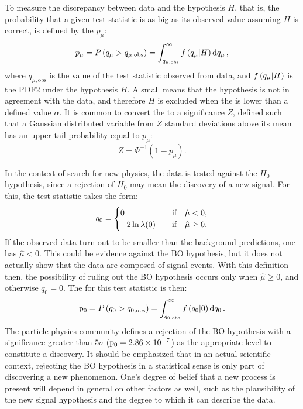 To measure the discrepancy between data and the hypothesis \(H\), that is, the probability that a given test statistic is as big as its observed value assuming \(H\) is correct, is defined by the \pval \(p_{\mu}\):
\begin{equation}
    p_{\mu} = P \left( q_{\mu} > q_{\mu, \text{obs}} \right) = \int_{q_{\mu, \text{obs}}}^{\infty} f \left(q_{\mu} | H\right) \dd{\ensuremath{q_{\mu}}},
\end{equation}
where \(q_{\mu, \text{obs}}\) is the value of the test statistic observed from data, and \(f\left(q_{\mu} | H\right)\) is the \qmu \ac{PDF2} under the hypothesis \(H\). A small \pval means that the hypothesis is not in agreement with the data, and therefore \(H\) is excluded when the \pval is lower than a defined value \(\alpha\). It is common to convert the \pval to a significance \(Z\), defined such that a Gaussian distributed variable from \(Z\) standard deviations above its mean has an upper-tail probability equal to \(p_{\mu}\):
\begin{equation}
    Z = \Phi^{-1} \left(1 - p_{\mu}\right).
\end{equation}

In the context of search for new physics, the data is tested against the \(H_0\) hypothesis, since a rejection of \(H_0\) may mean the discovery of a new signal. For this, the test statistic takes the form:
\begin{equation}
    q_0 = 
    \begin{cases}
        0 &\qif \hat{\mu} < 0,\\
        -2 \ln \lambda(0) &\qif \hat{\mu} \geq 0.
    \end{cases}
\end{equation}
If the observed data turn out to be smaller than the background predictions, one has \(\hat{\mu} < 0\). This could be evidence against the \ac{BO} hypothesis, but it does not actually show that the data are composed of signal events. With this definition then, the possibility of ruling out the \ac{BO} hypothesis occurs only when \(\hat{\mu} \geq 0\), and otherwise \(q_0 = 0\). The \pval for this test statistic is then:
\begin{equation}
    \mathrm{p}_{0} = P \left( q_0 > q_{0, \text{obs}} \right) = \int_{q_{0, \text{obs}}}^{\infty} f \left(q_0 | 0 \right) \dd{q_0}.
\end{equation}
The particle physics community defines a rejection of the \ac{BO} hypothesis with a significance greater than \(5\sigma\) (\(\mathrm{p}_{0} = 2.86 \times 10^{-7}\)) as the appropriate level to constitute a discovery. It should be emphasized that in an actual scientific context, rejecting the \ac{BO} hypothesis in a statistical sense is only part of discovering a new phenomenon. One's degree of belief that a new process is present will depend in general on other factors as well, such as the plausibility of the new signal hypothesis and the degree to which it can describe the data.



